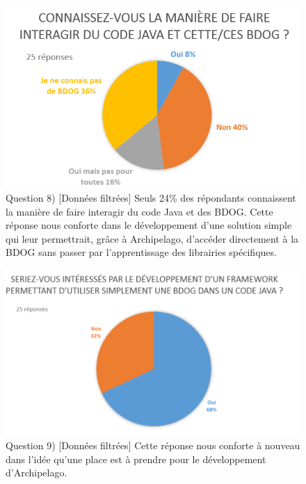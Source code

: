 \documentclass[a4paper,fleqn,12pt,oneside]{report}
\begin{document}
\begin{figure}[!ht]
\centering
\includegraphics[scale=1]{figures/QLibJavaFilt.png}
\caption{Question 8) [Données filtrées] Seuls 24\% des répondants connaissent la manière de faire interagir du code Java et des BDOG. Cette réponse nous conforte dans le développement d'une solution simple qui leur permettrait, grâce à Archipelago, d'accéder directement à la BDOG sans passer par l'apprentissage des librairies spécifiques.}
\label{fig:QLibJavaFilt}
\end{figure}
\begin{figure}[!ht]
\centering
\includegraphics[scale=0.8]{figures/QFrameworkIntFilt.png}
\caption{Question 9) [Données filtrées] Cette réponse nous conforte à nouveau dans l'idée qu'une place est à prendre pour le développement d'Archipelago.}
\label{fig:QFrameworkIntFilt}
\end{figure}
\end{document}
